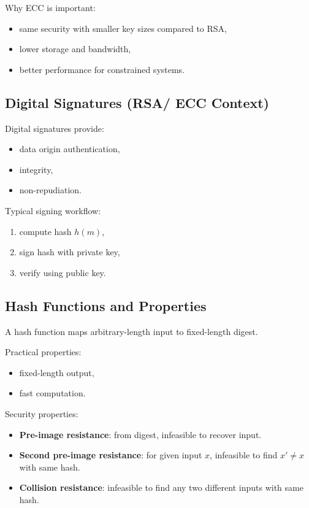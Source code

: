 \documentclass[12pt,a4paper]{article}
\begin{document}
Why ECC is important:
\begin{itemize}
\item same security with smaller key sizes compared to RSA,
\item lower storage and bandwidth,
\item better performance for constrained systems.
\end{itemize}

\subsection{Digital Signatures (RSA/ ECC Context)}
Digital signatures provide:
\begin{itemize}
\item data origin authentication,
\item integrity,
\item non-repudiation.
\end{itemize}

Typical signing workflow:
\begin{enumerate}
\item compute hash \(h(m)\),
\item sign hash with private key,
\item verify using public key.
\end{enumerate}

\subsection{Hash Functions and Properties}
A hash function maps arbitrary-length input to fixed-length digest.

Practical properties:
\begin{itemize}
\item fixed-length output,
\item fast computation.
\end{itemize}

Security properties:
\begin{itemize}
\item \textbf{Pre-image resistance}: from digest, infeasible to recover input.
\item \textbf{Second pre-image resistance}: for given input \(x\), infeasible to find \(x'\neq x\) with same hash.
\item \textbf{Collision resistance}: infeasible to find any two different inputs with same hash.
\end{itemize}
\end{document}
